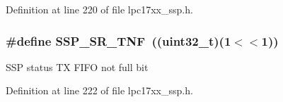 \-Definition at line 220 of file lpc17xx\-\_\-ssp.\-h.

\hypertarget{group___s_s_p___private___macros_gabde0199183f2a747cd039c66d40cf534}{
\subsubsection[{\-S\-S\-P\-\_\-\-S\-R\-\_\-\-T\-N\-F}]{\setlength{\rightskip}{0pt plus 5cm}\#define {\bf \-S\-S\-P\-\_\-\-S\-R\-\_\-\-T\-N\-F}~((uint32\-\_\-t)(1$<$$<$1))}}\label{group___s_s_p___private___macros_gabde0199183f2a747cd039c66d40cf534}
\-S\-S\-P status \-T\-X \-F\-I\-F\-O not full bit 

\-Definition at line 222 of file lpc17xx\-\_\-ssp.\-h.

